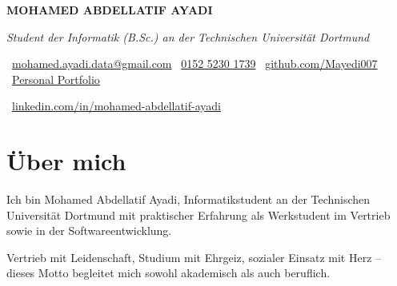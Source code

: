 \documentclass[10pt, letterpaper]{article}
\newenvironment{header}{
    \setlength{\topsep}{0pt}\par\kern\topsep\centering\linespread{1.5}
}{
    \par\kern\topsep
} %
\begin{document}
    \newcommand{\AND}{\unskip
        \cleaders\copy\ANDbox\hskip\wd\ANDbox
        \ignorespaces
    }
    \newsavebox\ANDbox
    \sbox\ANDbox{$|$}

    \begin{header}
   \begin{center}

    \vspace{0.5cm} %
    {\fontsize{20pt}{24pt}\selectfont \textbf{MOHAMED ABDELLATIF AYADI}}
\end{center}
        
\vspace{5 pt}

    \normalsize
    \textit{Student der Informatik (B.Sc.) an der Technischen Universität Dortmund}

        \vspace{5 pt}

      \faEnvelope\ \href{mailto:mohamed.ayadi.data@gmail.com}{\textcolor{primaryColor}{mohamed.ayadi.data@gmail.com}} \quad
\faPhone\ \href{tel:+49-152-5230-1739}{\textcolor{primaryColor}{0152 5230 1739}} \quad
\faGithub\ \href{https://github.com/Mayedi007}{\textcolor{primaryColor}{github.com/Mayedi007}} \quad
\faGlobe\ \href{https://personal-portfolio-mohamedayadidat.replit.app}{\textcolor{portfolioColor}{Personal Portfolio}} \quad

\faLinkedin\ \href{https://linkedin.com/in/mohamed-abdellatif-ayadi}{\textcolor{primaryColor}{linkedin.com/in/mohamed-abdellatif-ayadi}}

    \end{header}

    \vspace{1cm}

\section*{Über mich}

Ich bin Mohamed Abdellatif Ayadi, Informatikstudent an der Technischen Universität Dortmund mit praktischer Erfahrung als Werkstudent im Vertrieb sowie in der Softwareentwicklung.

Vertrieb mit Leidenschaft, Studium mit Ehrgeiz, sozialer Einsatz mit Herz – dieses Motto begleitet mich sowohl akademisch als auch beruflich.
\end{document}
